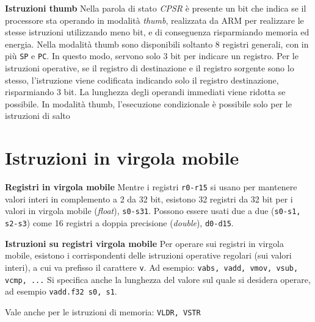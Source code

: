 \begin{defn}
    \textbf{Istruzioni thumb}
    Nella parola di stato \textit{CPSR} è presente un bit che indica se il processore
    sta operando in modalità \textit{thumb}, realizzata da ARM per realizzare le stesse istruzioni utilizzando meno bit,
    e di conseguenza risparmiando memoria ed energia.
    Nella modalità thumb sono disponibili soltanto 8 registri generali, con in più \texttt{SP} e \texttt{PC}.
    In questo modo, servono solo 3 bit per indicare un registro.
    Per le istruzioni operative, se il registro di destinazione e il registro sorgente sono lo stesso,
    l'istruzione viene codificata indicando solo il registro destinazione, risparmiando 3 bit.
    La lunghezza degli operandi immediati viene ridotta se possibile.
    In modalità thumb, l'esecuzione condizionale è possibile solo per le istruzioni di salto

\end{defn}

\section{Istruzioni in virgola mobile}

\begin{defn}
    \textbf{Registri in virgola mobile}
    Mentre i registri \texttt{r0-r15} si usano per mantenere valori interi in complemento a 2 da 32 bit,
    esistono 32 registri da 32 bit per i valori in virgola mobile (\textit{float}), \texttt{s0-s31}.
    Possono essere usati due a due (\texttt{s0-s1, s2-s3}) come 16 registri a doppia precisione (\textit{double}), \texttt{d0-d15}.
\end{defn}

\begin{defn}
    \textbf{Istruzioni su registri virgola mobile}
    Per operare sui registri in virgola mobile, esistono i corrispondenti delle istruzioni
    operative regolari (sui valori interi), a cui va prefisso il carattere \texttt{v}.
    Ad esempio: \texttt{vabs, vadd, vmov, vsub, vcmp, ...}
    Si specifica anche la lunghezza del valore sul quale si desidera operare, ad
    esempio \texttt{vadd.f32 s0, s1}.


    Vale anche per le istruzioni di memoria: \texttt{VLDR, VSTR}
\end{defn}

